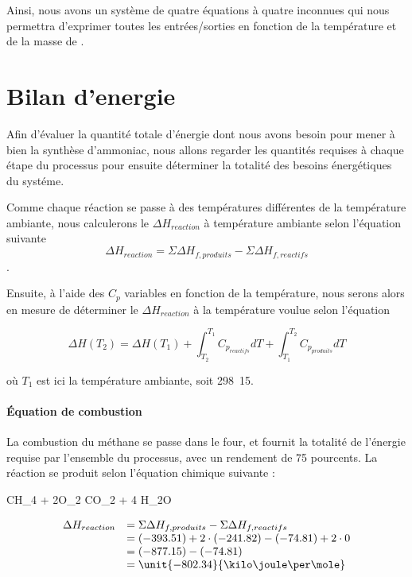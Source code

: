 \documentclass{article}
\begin{document}
Ainsi, nous avons un système de quatre équations à quatre inconnues qui nous permettra d'exprimer
toutes les entrées/sorties en fonction de la température et de la masse de . 
   
\section{Bilan d'energie}
Afin d'évaluer la quantité totale d'énergie dont nous avons besoin pour mener à 
bien la synthèse d'ammoniac, nous allons regarder les quantités requises à chaque 
étape du processus pour ensuite déterminer la totalité des besoins énergétiques du
systéme.

Comme chaque réaction se passe à des températures différentes de la température ambiante,
nous calculerons le $\Delta H_{reaction}$ à température ambiante selon l'équation suivante 
$$\Delta H_{reaction} = \Sigma \Delta H_{f,produits} - \Sigma \Delta H_{f,reactifs}$$.

Ensuite, à l'aide des $C_{p}$ variables en fonction de la température, nous serons alors en 
mesure de déterminer le $\Delta H_{reaction}$ à la température voulue selon l'équation

$$\Delta H(T_2) = \Delta H(T_{1}) 
+ \int_{T_2}^{T_1} C_{p_{reactifs}} dT + \int_{T_1}^{T_2} C_{p_{produits}} dT$$ 

où $T_1$ est ici la température ambiante, soit \unit{298.15}{\kelvin}.

\paragraph{\'Equation de combustion}
La combustion du méthane se passe dans le four, et fournit la totalité de l'énergie 
requise par l'ensemble du processus, avec un rendement de 75 pourcents.
La réaction se produit selon l'équation chimique suivante :

\begin{chemmath}
	CH_4 + 2O_2 \Longrightarrow CO_2 + 4 H_2O
\end{chemmath}

$$
	\begin{array}{rl}
	\Delta H_{reaction}		&=  \Sigma \Delta H_{f,produits} - \Sigma \Delta H_{f,reactifs} \\
												&=  (-393.51) + 2\cdot(-241.82) - (-74.81) + 2\cdot0 \\
												&=  (-877.15) - (-74.81)\\
												&=  \unit{-802.34}{\kilo\joule\per\mole}
	\end{array}
$$
\end{document}
